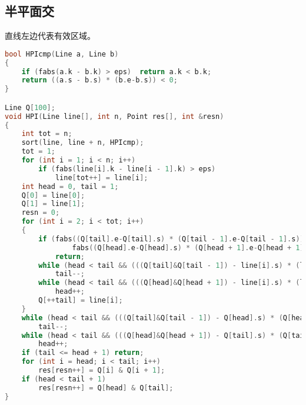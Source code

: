 \subsection{半平面交}
	直线左边代表有效区域。
	\begin{lstlisting}[language=c++]
bool HPIcmp(Line a, Line b)
{
	if (fabs(a.k - b.k) > eps)	return a.k < b.k;
	return ((a.s - b.s) * (b.e-b.s)) < 0;
}

Line Q[100];
void HPI(Line line[], int n, Point res[], int &resn)
{
	int tot = n;
	sort(line, line + n, HPIcmp);
	tot = 1;
	for (int i = 1; i < n; i++)
		if (fabs(line[i].k - line[i - 1].k) > eps)
			line[tot++] = line[i];
	int head = 0, tail = 1;
	Q[0] = line[0];
	Q[1] = line[1];
	resn = 0;
	for (int i = 2; i < tot; i++)
	{
		if (fabs((Q[tail].e-Q[tail].s) * (Q[tail - 1].e-Q[tail - 1].s)) < eps ||
				fabs((Q[head].e-Q[head].s) * (Q[head + 1].e-Q[head + 1].s)) < eps)
			return;
		while (head < tail && (((Q[tail]&Q[tail - 1]) - line[i].s) * (line[i].e-line[i].s)) > eps)
			tail--;
		while (head < tail && (((Q[head]&Q[head + 1]) - line[i].s) * (line[i].e-line[i].s)) > eps)
			head++;
		Q[++tail] = line[i];
	}
	while (head < tail && (((Q[tail]&Q[tail - 1]) - Q[head].s) * (Q[head].e-Q[head].s)) > eps)
		tail--;
	while (head < tail && (((Q[head]&Q[head + 1]) - Q[tail].s) * (Q[tail].e-Q[tail].s)) > eps)
		head++;
	if (tail <= head + 1) return;
	for (int i = head; i < tail; i++)
		res[resn++] = Q[i] & Q[i + 1];
	if (head < tail + 1)
		res[resn++] = Q[head] & Q[tail];
}
	\end{lstlisting}
